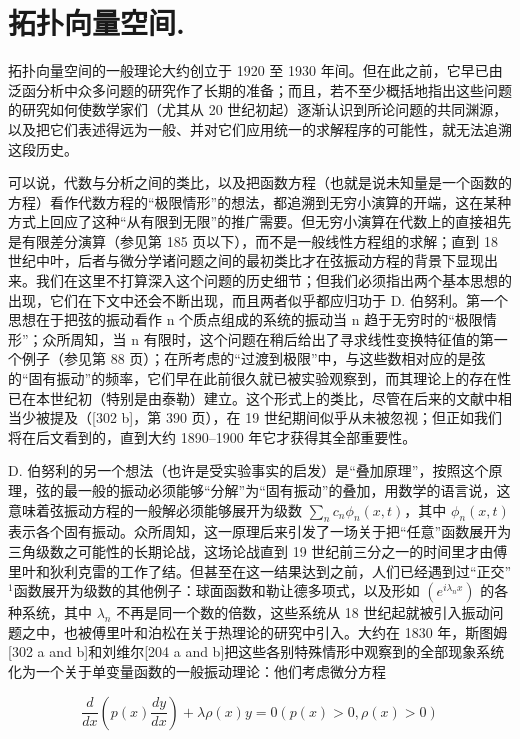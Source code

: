 \chapter{拓扑向量空间.}

拓扑向量空间的一般理论大约创立于 1920 至 1930 年间。但在此之前，它早已由泛函分析中众多问题的研究作了长期的准备；而且，若不至少概括地指出这些问题的研究如何使数学家们（尤其从 20 世纪初起）逐渐认识到所论问题的共同渊源，以及把它们表述得远为一般、并对它们应用统一的求解程序的可能性，就无法追溯这段历史。

可以说，代数与分析之间的类比，以及把函数方程（也就是说未知量是一个函数的方程）看作代数方程的“极限情形”的想法，都追溯到无穷小演算的开端，这在某种方式上回应了这种“从有限到无限”的推广需要。但无穷小演算在代数上的直接祖先是有限差分演算（参见第 185 页以下），而不是一般线性方程组的求解；直到 18 世纪中叶，后者与微分学诸问题之间的最初类比才在弦振动方程的背景下显现出来。我们在这里不打算深入这个问题的历史细节；但我们必须指出两个基本思想的出现，它们在下文中还会不断出现，而且两者似乎都应归功于 D. 伯努利。第一个思想在于把弦的振动看作 n 个质点组成的系统的振动当 n 趋于无穷时的“极限情形”；众所周知，当 n 有限时，这个问题在稍后给出了寻求线性变换特征值的第一个例子（参见第 88 页）；在所考虑的“过渡到极限”中，与这些数相对应的是弦的“固有振动”的频率，它们早在此前很久就已被实验观察到，而其理论上的存在性已在本世纪初（特别是由泰勒）建立。这个形式上的类比，尽管在后来的文献中相当少被提及（{[}302 b{]}，第 390 页），在 19 世纪期间似乎从未被忽视；但正如我们将在后文看到的，直到大约 1890–1900 年它才获得其全部重要性。

D. 伯努利的另一个想法（也许是受实验事实的启发）是“叠加原理”，按照这个原理，弦的最一般的振动必须能够“分解”为“固有振动”的叠加，用数学的语言说，这意味着弦振动方程的一般解必须能够展开为级数 \(\sum_{n} c_{n} \phi_{n}(x, t)\)，其中 \(\phi_{n}(x, t)\) 表示各个固有振动。众所周知，这一原理后来引发了一场关于把“任意”函数展开为三角级数之可能性的长期论战，这场论战直到 19 世纪前三分之一的时间里才由傅里叶和狄利克雷的工作了结。但甚至在这一结果达到之前，人们已经遇到过“正交”\(^{1}\)函数展开为级数的其他例子：球面函数和勒让德多项式，以及形如 \((e^{i\lambda_{n}x})\) 的各种系统，其中 \(\lambda_{n}\) 不再是同一个数的倍数，这些系统从 18 世纪起就被引入振动问题之中，也被傅里叶和泊松在关于热理论的研究中引入。大约在 1830 年，斯图姆{[}302 a and b{]}和刘维尔{[}204 a and b{]}把这些各别特殊情形中观察到的全部现象系统化为一个关于单变量函数的一般振动理论：他们考虑微分方程

\[
\frac {d}{d x} \left(p (x) \frac {d y}{d x}\right) + \lambda \rho (x) y = 0 (p (x) > 0, \rho (x) > 0)\tag{21.1}
\]

